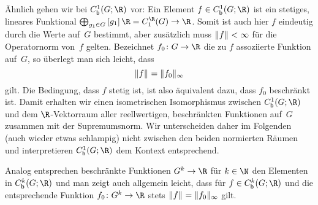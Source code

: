 Ähnlich gehen wir bei $\Cb^1(G;\R)$ vor: Ein Element $f\in\Cb^1(G;\R)$ ist ein
stetiges, lineares Funktional
$\bigoplus_{g_1\in G}\, [g_1]\,\R = C_1^{\R}(G) \to \R$.
Somit ist auch hier $f$ eindeutig durch die Werte auf~$G$ bestimmt, aber
zusätzlich muss $\lVert f\rVert_{} < \infty$ für die Operatornorm von~$f$ gelten.
Bezeichnet $f_0\colon G\to\R$ die zu $f$ assoziierte Funktion auf~$G$, so
überlegt man sich leicht, dass
\[ \lVert f\rVert_{} = \lVert f_0\rVert_\infty \]
gilt. Die Bedingung, dass $f$ stetig ist, ist also äquivalent dazu, dass
$f_0$ beschränkt ist. Damit erhalten wir einen isometrischen Isomorphismus
zwischen $\Cb^1(G;\R)$ und dem $\R$-Vektorraum aller reellwertigen, beschränkten
Funktionen auf~$G$ zusammen mit der Supremumsnorm. Wir unterscheiden daher im
Folgenden (auch wieder etwas schlampig) nicht zwischen den beiden normierten
Räumen und interpretieren $\Cb^1(G;\R)$ dem Kontext entsprechend.

Analog entsprechen beschränkte Funktionen $G^k\to\R$ für $k\in\N$ den Elementen
in $\Cb^k(G;\R)$ und man zeigt auch allgemein leicht, dass für $f\in\Cb^k(G;\R)$
und die entsprechende Funktion $f_0\colon G^k\to\R$ stets
$\lVert f\rVert_{} = \lVert f_0\rVert_\infty$ gilt.
